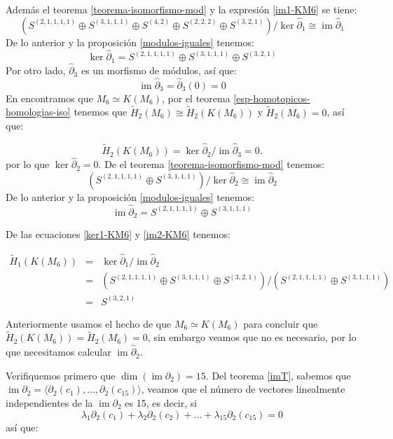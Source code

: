 \documentclass[12pt]{book}
\theoremstyle{definition}
\DeclareMathOperator{\im}{im}
\newcounter{in}
\begin{document}
Además el teorema \ref{teorema-isomorfismo-mod} y la expresión \ref{im1-KM6} se tiene:
$$(S^{(2,1,1,1,1)}\oplus S^{(3,1,1,1)}\oplus S^{(4,2)}\oplus
      S^{(2,2,2)}\oplus S^{(3,2,1)})/\ker \widehat\partial_{1}\cong \im \widehat\partial_{1}$$
De lo anterior y la proposición \ref{modulos-iguales} tenemos:
\begin{equation}
\label{ker1-KM6}
\ker \widehat\partial_{1}=S^{(2,1,1,1,1)}\oplus S^{(3,1,1,1)}\oplus S^{(3,2,1)}
\end{equation}
Por otro lado, $\widehat\partial_{3}$ es un morfismo de módulos, así que:
\begin{equation*}
\im\widehat\partial_{3}=\widehat\partial_{3}(0)=0
\label{im3-KM6}
\end{equation*}
En \cite{larrion2009clique} encontramos que $M_{6}\simeq K(M_{6})$,
por el teorema \ref{esp-homotopicos-homologias-iso} tenemos que
$\widetilde H_{2}(M_{6})\cong \widetilde H_{2}(K(M_{6}))$ y  $\widetilde
H_{2}(M_{6})=0$, así que:

\begin{equation*}
\widetilde H_{2}(K(M_{6}))=\ker \widehat\partial_{2}/\im \widehat\partial_{3}=0.
\end{equation*}
por lo que $\ker \widehat\partial_{2}=0$. De el teorema
\ref{teorema-isomorfismo-mod} tenemos:
$$(S^{(2,1,1,1,1)}\oplus S^{(3,1,1,1)})/\ker \widehat\partial_{2}\cong \im
\widehat\partial_{2}$$
De lo anterior y la proposición \ref{modulos-iguales} tenemos:
\begin{equation}
\im \widehat\partial_{2}=S^{(2,1,1,1,1)}\oplus S^{(3,1,1,1)}
\label{im2-KM6}
\end{equation}

De las ecuaciones \ref{ker1-KM6} y \ref{im2-KM6} tenemos:

\begin{eqnarray*}
  \widetilde H_{1}(K(M_{6}))&=&\ker \widehat\partial_{1}/\im
  \widehat\partial_{2}\\
  &=&(S^{(2,1,1,1,1)}\oplus S^{(3,1,1,1)}\oplus
  S^{(3,2,1)})/(S^{(2,1,1,1,1)}\oplus S^{(3,1,1,1)})\\
  &=&S^{(3,2,1)}
\end{eqnarray*}

Anteriormente usamos el hecho de que $M_{6}\simeq K(M_{6})$  para
concluir que $\widetilde H_{2}(K(M_{6}))=\widetilde H_{2}(M_{6})=0$, sin embargo veamos que no es necesario, por lo que
necesitamos calcular $\im \widehat\partial_{2}$. 

Verifiquemos primero que $\dim(\im \partial_{2})=15$. Del teorema
\ref{imT}, sabemos que
$\im \partial_{2}=\langle\partial_{2}(c_{1}),\ldots,\partial_{2}(c_{15})\rangle$,
veamos que el número de vectores linealmente independientes de la
$\im \partial_{2}$ es 15, es
decir, si
$$\lambda_{1}\partial_{2}(c_{1})+\lambda_{2}\partial_{2}(c_{2})+\ldots+\lambda_{15}\partial_{2}(c_{15})=0$$
así que:
\end{document}
